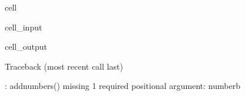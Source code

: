 \documentclass[letterpaper,10pt,english]{jupyterBook}
\begin{document}
\begin{sphinxuseclass}{cell}\begin{sphinxVerbatimInput}

\begin{sphinxuseclass}{cell_input}
\begin{sphinxVerbatim}[commandchars=\\\{\}]
  
\end{sphinxVerbatim}

\end{sphinxuseclass}\end{sphinxVerbatimInput}
\begin{sphinxVerbatimOutput}

\begin{sphinxuseclass}{cell_output}
\begin{sphinxVerbatim}[commandchars=\\\{\}]
Traceback (most recent call last)
  
   

: add\PYGZus{}numbers() missing 1 required positional argument: \PYGZsq{}number\PYGZus{}b\PYGZsq{}
\end{sphinxVerbatim}

\end{sphinxuseclass}\end{sphinxVerbatimOutput}

\end{sphinxuseclass}
\end{document}
